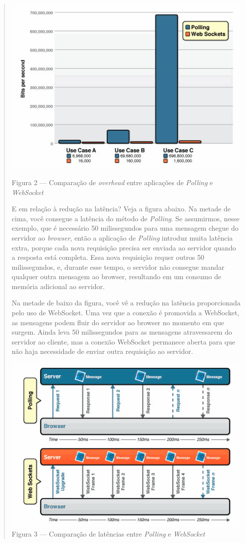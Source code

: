 \documentclass[a4paper,12pt]{article}
\begin{document}
\begin{quotation}
\includegraphics[width=1\linewidth]{images/comp.png}

Figura 2 — Comparação de \emph{overhead} entre aplicações de \emph{Polling} e \emph{WebSocket}

E em relação à redução na latência? Veja a figura abaixo. Na metade de cima, você consegue a latência do método de \emph{Polling}. Se assumirmos, nesse exemplo, que é necessário 50 milissegundos para uma mensagem chegue do servidor ao \emph{browser}, então a aplicação de \emph{Polling} introduz muita latência extra, porque cada nova requisição precisa ser enviada ao servidor quando a resposta está completa. Essa nova requisição requer outros 50 milissegundos, e, durante esse tempo, o servidor não consegue mandar qualquer outra mensagem ao browser, resultando em um consumo de memória adicional ao servidor.

Na metade de baixo da figura, você vê a redução na latência proporcionada pelo uso de WebSocket. Uma vez que a conexão é promovida a WebSocket, as mensagens podem fluir do servidor ao browser no momento em que surgem. Ainda leva 50 milissegundos para as mensagens atravessarem do servidor ao cliente, mas a conexão WebSocket permanece aberta para que não haja necessidade de enviar outra requisição ao servidor.


\includegraphics[width=1\linewidth]{images/latency.png}
Figura 3 — Comparação de latências entre \emph{Polling} e \emph{WebSocket}
\end{quotation}
\end{document}
